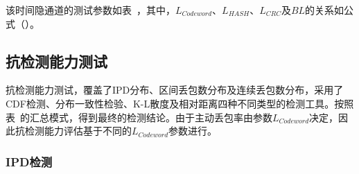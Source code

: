
该时间隐通道的测试参数如表\ ，其中，$L_{Codeword}$、$L_{HASH}$、$L_{CRC}$及$BL$的关系如公式（）。

\subsection{抗检测能力测试}
\label{chap:hash:result:undetectability}

抗检测能力测试，覆盖了IPD分布、区间丢包数分布及连续丢包数分布，采用了CDF检测、分布一致性检验、K-L散度及相对距离四种不同类型的检测工具。按照表\ 的汇总模式，得到最终的检测结论。由于主动丢包率由参数$L_{Codeword}$决定，因此抗检测能力评估基于不同的$L_{Codeword}$参数进行。

\subsubsection{IPD检测}
\label{chap:hash:result:undetectability:ipd}

